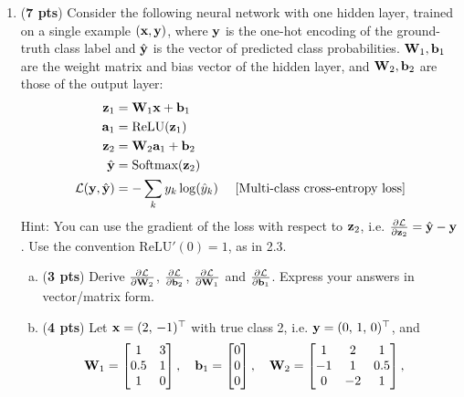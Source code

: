 \documentclass[11pt]{exam}
\begin{document}
\begin{enumerate}[1.]
\item (\textbf{7 pts}) Consider the following neural network with one hidden layer, trained on a single example $({\bf x}, {\bf y})$, where ${\bf y}$ is the one-hot encoding of the ground-truth class label and $\hat{\bf y}$ is the vector of predicted class probabilities. ${\bf W}_1, {\bf b}_1$ are the weight matrix and bias vector of the hidden layer, and ${\bf W}_2, {\bf b}_2$ are those of the output layer:
\begin{align*}
     {\bf z}_1 &= {\bf W}_1 {\bf x} + {\bf b}_1\\
     {\bf a}_1 &= \text{ReLU}({\bf z}_1)\\
     {\bf z}_2 &= {\bf W}_2 {\bf a}_1 + {\bf b}_2\\
     \hat{\bf y} &= \text{Softmax}({\bf z}_2)\\
     \mathcal{L}({\bf y},\hat{\bf y}) &= - \sum_{k} y_k \log(\hat{y}_k) 
     &\text{ [Multi-class cross-entropy loss]}
\end{align*}
Hint: You can use the gradient of the loss with respect to ${\bf z}_2$, i.e. $\frac{\partial \mathcal{L}}{\partial {\bf z}_2} = \hat{\bf y} - {\bf y}$. Use the convention $\text{ReLU}'(0) = 1$, as in 2.3.
\begin{enumerate}[(a)]
    \item ({\bf 3 pts}) Derive $\frac{\partial \mathcal{L}}{\partial {\bf W}_2}$, $\frac{\partial \mathcal{L}}{\partial {\bf b}_2}$, $\frac{\partial \mathcal{L}}{\partial {\bf W}_1}$ and $\frac{\partial \mathcal{L}}{\partial {\bf b}_1}$. Express your answers in vector/matrix form.
    \begin{tcolorbox}
\vspace{55ex}
\end{tcolorbox}
\newpage
    \item ({\bf 4 pts}) Let ${\bf x} = (2,\, -1)^\top$ with true class 2, i.e. ${\bf y} = (0,\, 1,\, 0)^\top$, and
    \[
    {\bf W}_1 = \begin{bmatrix} 1 & 3 \\ 0.5 & 1 \\ 1 & 0 \end{bmatrix}, \quad
    {\bf b}_1 = \begin{bmatrix} 0 \\ 0 \\ 0 \end{bmatrix}, \quad
    {\bf W}_2 = \begin{bmatrix} 1 & 2 & 1 \\ -1 & 1 & 0.5 \\ 0 & -2 & 1 \end{bmatrix}, \quad
\]
\end{enumerate}
\end{enumerate}
\end{document}
